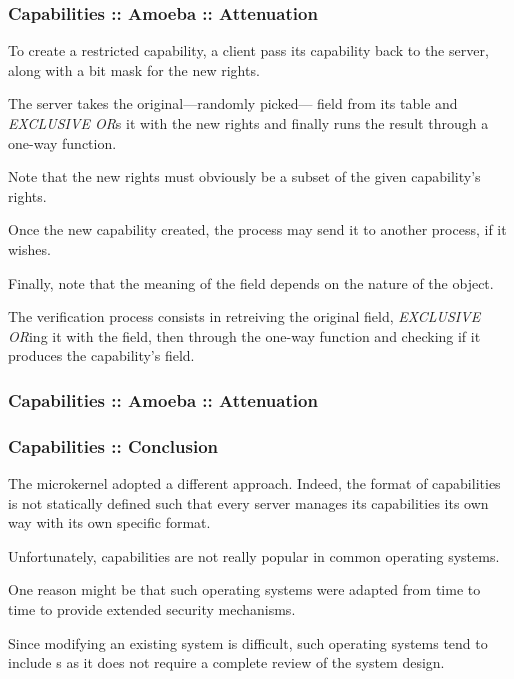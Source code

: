 
\begin{frame}
  \frametitle{Capabilities :: Amoeba :: Attenuation}

  To create a restricted capability, a client pass its capability back to the
  server, along with a bit mask for the new rights.

  \-

  The server takes the original---randomly picked--- field from
  its table and \textit{EXCLUSIVE OR}s it with the new rights and finally
  runs the result through a one-way function.

  \-

  Note that the new rights must obviously be a subset of the given
  capability's rights.

  \-

  Once the new capability created, the process may send it to another process,
  if it wishes.

  \-

  Finally, note that the meaning of the  field depends on the
  nature of the object.

  \-

  The verification process consists in retreiving the original 
  field, \textit{EXCLUSIVE OR}ing it with the  field, then
  through the one-way function and checking if it produces the capability's
   field.
\end{frame}


\begin{frame}
  \frametitle{Capabilities :: Amoeba :: Attenuation}

  \begin{center}
  \end{center}
\end{frame}


\begin{frame}
  \frametitle{Capabilities :: Conclusion}

  The  microkernel adopted a different approach. Indeed, the
  format of capabilities is not statically defined such that every server
  manages its capabilities its own way with its own specific format.

  \-

  Unfortunately, capabilities are not really popular in common operating
  systems.

  \-

  One reason might be that such operating systems were adapted from time
  to time to provide extended security mechanisms.

  \-

  Since modifying an existing system is difficult, such operating systems
  tend to include s as it does not require a complete review of the
  system design.
\end{frame}

